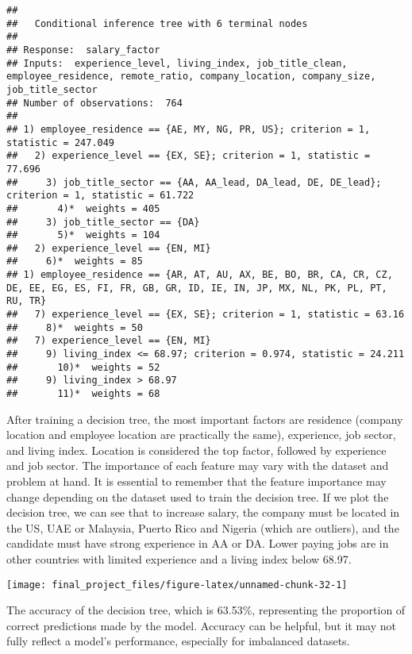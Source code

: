 \documentclass[
]{article}
\begin{document}
\begin{verbatim}
## 
##   Conditional inference tree with 6 terminal nodes
## 
## Response:  salary_factor 
## Inputs:  experience_level, living_index, job_title_clean, employee_residence, remote_ratio, company_location, company_size, job_title_sector 
## Number of observations:  764 
## 
## 1) employee_residence == {AE, MY, NG, PR, US}; criterion = 1, statistic = 247.049
##   2) experience_level == {EX, SE}; criterion = 1, statistic = 77.696
##     3) job_title_sector == {AA, AA_lead, DA_lead, DE, DE_lead}; criterion = 1, statistic = 61.722
##       4)*  weights = 405 
##     3) job_title_sector == {DA}
##       5)*  weights = 104 
##   2) experience_level == {EN, MI}
##     6)*  weights = 85 
## 1) employee_residence == {AR, AT, AU, AX, BE, BO, BR, CA, CR, CZ, DE, EE, EG, ES, FI, FR, GB, GR, ID, IE, IN, JP, MX, NL, PK, PL, PT, RU, TR}
##   7) experience_level == {EX, SE}; criterion = 1, statistic = 63.16
##     8)*  weights = 50 
##   7) experience_level == {EN, MI}
##     9) living_index <= 68.97; criterion = 0.974, statistic = 24.211
##       10)*  weights = 52 
##     9) living_index > 68.97
##       11)*  weights = 68
\end{verbatim}

\normalsize

After training a decision tree, the most important factors are residence
(company location and employee location are practically the same),
experience, job sector, and living index. Location is considered the top
factor, followed by experience and job sector. The importance of each
feature may vary with the dataset and problem at hand. It is essential
to remember that the feature importance may change depending on the
dataset used to train the decision tree. If we plot the decision tree,
we can see that to increase salary, the company must be located in the
US, UAE or Malaysia, Puerto Rico and Nigeria (which are outliers), and
the candidate must have strong experience in AA or DA. Lower paying jobs
are in other countries with limited experience and a living index below
68.97.

\scriptsize

\normalsize

\scriptsize

\begin{center}\texttt{[image: final\_project\_files/figure-latex/unnamed-chunk-32-1]} \end{center}

\normalsize

The accuracy of the decision tree, which is 63.53\%, representing the
proportion of correct predictions made by the model. Accuracy can be
helpful, but it may not fully reflect a model's performance, especially
for imbalanced datasets.
\end{document}
